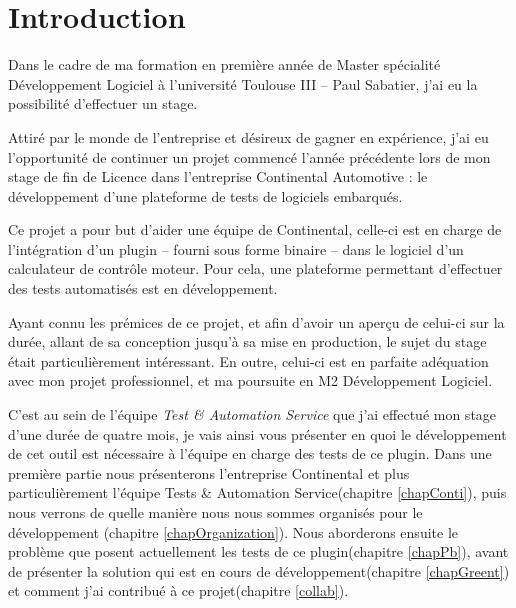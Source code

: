 \chapter*{Introduction}

Dans le cadre de ma formation en première année de Master spécialité Développement Logiciel à l'université Toulouse III – Paul Sabatier, j'ai eu la possibilité d'effectuer un stage.


Attiré par le monde de l'entreprise et désireux de gagner en expérience, j'ai eu l'opportunité de continuer un projet commencé l'année précédente lors de mon stage de fin de Licence dans l'entreprise Continental Automotive : le développement d'une plateforme de tests de logiciels embarqués.

Ce projet a pour but d'aider une équipe de Continental, celle-ci est en charge de l'intégration d'un plugin -- fourni sous forme binaire -- dans le logiciel d'un calculateur de contrôle moteur. Pour cela, une plateforme permettant d'effectuer des tests automatisés est en développement.

Ayant connu les prémices de ce projet, et afin d'avoir un aperçu de celui-ci sur la durée, allant de sa conception jusqu'à sa mise en production, le sujet du stage était particulièrement intéressant. En outre, celui-ci est en parfaite adéquation avec mon projet professionnel, et ma poursuite en M2 Développement Logiciel.

C'est au sein de l'équipe \textit{Test \& Automation Service} que j'ai effectué mon stage d'une durée de quatre mois, je vais ainsi vous présenter en quoi le développement de cet outil est nécessaire à l'équipe en charge des tests de ce plugin. Dans une première partie nous présenterons l'entreprise Continental et plus particulièrement l'équipe Tests \& Automation Service(chapitre \ref{chapConti}), puis nous verrons de quelle manière nous nous sommes organisés pour le développement (chapitre \ref{chapOrganization}). Nous aborderons ensuite le problème que posent actuellement les tests de ce plugin(chapitre \ref{chapPb}), avant de présenter la solution qui est en cours de développement(chapitre \ref{chapGreent}) et comment j'ai contribué à ce projet(chapitre \ref{collab}). 
